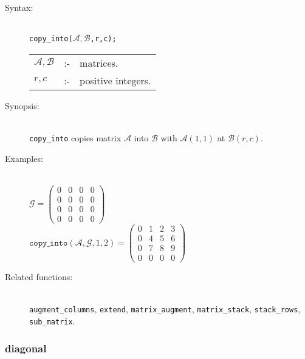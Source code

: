 \begin{description}
\item[Syntax:]\mbox{}\\
\texttt{copy\_into($\mathcal{A,B}$,r,c);}\\[2mm]
\begin{tabular}{l l l}
$\mathcal{A,B}$ &:-& matrices. \\
$r,c$          &:-& positive integers.
\end{tabular}

\item[Synopsis:]\mbox{}\\
\texttt{copy\_into} copies matrix $\mathcal{A}$ into
                $\mathcal{B}$ with $\mathcal{A}(1,1)$ at $\mathcal{B}(r,c)$.

\item[Examples:]\mbox{}\\
  \(\mathcal{G} = \begin{pmatrix} 0 & 0 & 0 & 0 \\ 0 & 0 & 0 & 0 \\
    0 & 0 & 0 & 0 \\ 0 & 0 & 0 & 0 \end{pmatrix}\) \\[2mm]
  \(\texttt{copy\_into}(\mathcal{A,G},1,2)  =
  \begin{pmatrix} 0 & 1 & 2 & 3 \\ 0 & 4 & 5 & 6 \\ 0 & 7 & 8
    & 9 \\ 0 & 0 & 0 & 0  \end{pmatrix}\)

\item[Related functions:]\mbox{}\\
\texttt{augment\_columns}, \texttt{extend}, \texttt{matrix\_augment},
\texttt{matrix\_stack}, \texttt{stack\_rows}, \texttt{sub\_matrix}.

\end{description}


\subsubsection{diagonal}
\label{linalg:diagonal}

